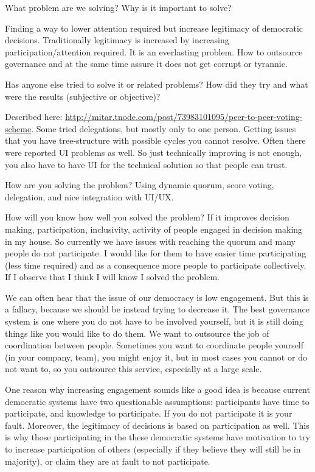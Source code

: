 \documentclass{sigchi}
\begin{document}
What problem are we solving? Why is it important to solve?

Finding a way to lower attention required but increase legitimacy of democratic decisions.
Traditionally legitimacy is increased by increasing participation/attention required.
It is an everlasting problem.
How to outsource governance and at the same time assure it does not get corrupt
or tyrannic.

Has anyone else tried to solve it or related problems? How did they try
and what were the results (subjective or objective)?

Described here: \url{http://mitar.tnode.com/post/73983101095/peer-to-peer-voting-scheme}.
Some tried delegations, but mostly only to one person.
Getting issues that you have tree-structure with possible cycles you cannot resolve.
Often there were reported UI problems as well.
So just technically improving is not enough, you also have to have UI for the technical solution so that people can trust.

How are you solving the problem?
Using dynamic quorum, score voting, delegation, and nice integration with UI/UX.

How will you know how well you solved the problem?
If it improves decision making, participation, inclusivity, activity of people engaged in decision making in my house.
So currently we have issues with reaching the quorum and many people do not participate.
I would like for them to have easier time participating (less time required) and as a consequence more people to
participate collectively.
If I observe that I think I will know I solved the problem.


We can often hear that the issue of our democracy is low engagement.
But this is a fallacy, because we should be instead trying to decrease it.
The best governance system is one where you do not have to be involved yourself, but it is still doing things
like you would like to do them.
We want to outsource the job of coordination between people.
Sometimes you want to coordinate people yourself (in your company, team), you might enjoy it, but in most cases
you cannot or do not want to, so you outsource this service, especially at a large scale.

One reason why increasing engagement sounds like a good idea is because current democratic systems have two
questionable assumptions: participants have time to participate, and knowledge to participate.
If you do not participate it is your fault.
Moreover, the legitimacy of decisions is based on participation as well.
This is why those participating in the these democratic systems have motivation to try to increase participation
of others (especially if they believe they will still be in majority), or claim they are at fault to not participate.
\end{document}
